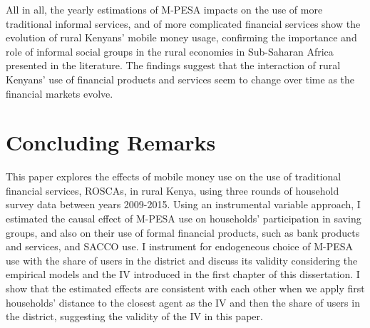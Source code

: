 \documentclass[11pt]{article}
\numberwithin{equation}{section}
\begin{document}
All in all, the yearly estimations of M-PESA impacts on the use of more traditional informal services, and of more complicated financial services show the evolution of rural Kenyans' mobile money usage, confirming the importance and role of informal social groups in the rural economies in Sub-Saharan Africa presented in the literature. The findings suggest that the interaction of rural Kenyans' use of financial products and services seem to change over time as the financial markets evolve. 

\section{Concluding Remarks}

This paper explores the effects of mobile money use on the use of traditional financial services, ROSCAs, in rural Kenya, using three rounds of household survey data between years 2009-2015. 
Using an instrumental variable approach, I estimated the causal effect of M-PESA use on households' participation in saving groups, and also on their use of formal financial products, such as bank products and services, and SACCO use. I instrument for endogeneous choice of M-PESA use with the share of users in the district and discuss its validity considering the empirical models and the IV introduced in the first chapter of this dissertation. I show that the estimated effects are consistent with each other when we apply first households' distance to the closest agent as the IV and then the share of users in the district, suggesting the validity of the IV in this paper.


\end{document}
